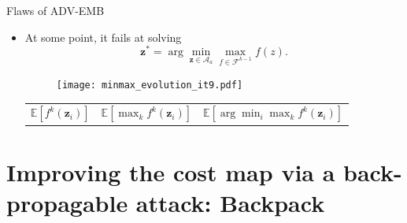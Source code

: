\documentclass[10pt,aspectratio=169]{beamer}
\newcommand{\fset}{\mathcal{F}}
\begin{document}
\begin{frame}{Flaws of ADV-EMB}

    \begin{itemize}
            
        \item At some point, it fails at solving
            \begin{equation*}
                \mathbf{z}^\ast = \arg \min_{\mathbf{z} \in \mathcal{A}_a} \max_{f \in \fset^{k-1}} f(z).
            \end{equation*} 
            
            \begin{figure}
                \texttt{[image: minmax\_evolution\_it9.pdf]}
             \end{figure}
            
            \vspace{-0.7cm} \hspace{2cm}
            \begin{tabular}{m{5cm} m{2cm} m{4cm}}
                \hspace{2.2cm} $\mathbb{E}[f^k(\mathbf{z}_i)]$ & 
                $\mathbb{E}[\max_k f^k(\mathbf{z}_i)]$ &
                $\mathbb{E}[\arg \min_i \max_k f^k(\mathbf{z}_i)]$
            \end{tabular}
              
    \end{itemize}

\end{frame}
    



\section{Improving the cost map via a back-propagable attack: Backpack}
\end{document}
